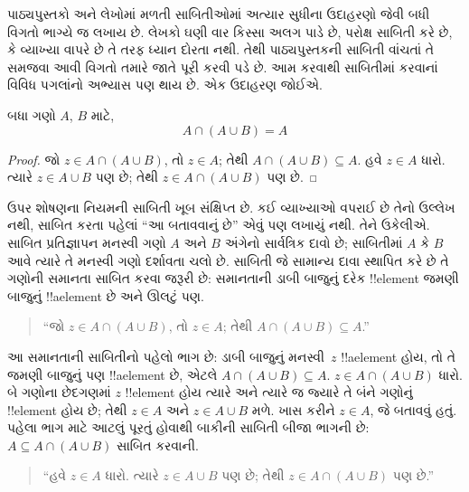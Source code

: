 \documentclass[../../../include/open-logic-section]{subfiles}
\begin{document}

પાઠ્યપુસ્તકો અને લેખોમાં મળતી સાબિતીઓમાં અત્યાર સુધીના
ઉદાહરણો જેવી બધી વિગતો ભાગ્યે જ લખાય છે. લેખકો ઘણી વાર
કિસ્સા અલગ પાડે છે, પરોક્ષ સાબિતી કરે છે, કે વ્યાખ્યા વાપરે છે
તે તરફ ધ્યાન દોરતા નથી. તેથી પાઠ્યપુસ્તકની સાબિતી વાંચતાં
તે સમજવા આવી વિગતો તમારે જાતે પૂરી કરવી પડે છે. આમ કરવાથી
સાબિતીમાં કરવાનાં વિવિધ પગલાંનો અભ્યાસ પણ થાય છે. એક
ઉદાહરણ જોઈએ.

\begin{prop}[શોષણ]
બધા ગણો $A$, $B$ માટે,
\[
A \cap (A \cup B) = A
\]
\end{prop}

\begin{proof}
જો $z \in A \cap (A \cup B)$, તો $z \in A$; તેથી $A \cap (A \cup B)
\subseteq A$. હવે $z \in A$ ધારો. ત્યારે $z \in A \cup B$ પણ છે;
તેથી $z \in A \cap (A \cup B)$ પણ છે.
\end{proof}

ઉપર શોષણના નિયમની સાબિતી ખૂબ સંક્ષિપ્ત છે. કઈ વ્યાખ્યાઓ
વપરાઈ છે તેનો ઉલ્લેખ નથી, સાબિત કરતા પહેલાં ``આ બતાવવાનું
છે'' એવું પણ લખાયું નથી. તેને ઉકેલીએ. સાબિત પ્રતિજ્ઞાપન
મનસ્વી ગણો $A$ અને $B$ અંગેનો સાર્વત્રિક દાવો છે; સાબિતીમાં
$A$ કે $B$ આવે ત્યારે તે મનસ્વી ગણો દર્શાવતા ચલો છે.
સાબિતી જે સામાન્ય દાવા સ્થાપિત કરે છે તે ગણોની સમાનતા
સાબિત કરવા જરૂરી છે: સમાનતાની ડાબી બાજુનું દરેક !!{element}
જમણી બાજુનું !!a{element} છે અને ઊલટું પણ.

\begin{quote}
``જો $z \in A \cap (A \cup B)$, તો $z \in A$; તેથી $A \cap (A \cup B)
  \subseteq A$.''
\end{quote}

આ સમાનતાની સાબિતીનો પહેલો ભાગ છે: ડાબી બાજુનું મનસ્વી~$z$
!!a{element} હોય, તો તે જમણી બાજુનું પણ !!a{element} છે,
એટલે $A \cap (A \cup B) \subseteq A$. $z \in A \cap (A \cup B)$
ધારો. બે ગણોના છેદગણમાં $z$ !!{element} હોય ત્યારે અને ત્યારે જ
જ્યારે તે બંને ગણોનું !!{element} હોય છે; તેથી $z \in A$
અને $z \in A \cup B$ મળે. ખાસ કરીને $z \in A$, જે બતાવવું
હતું. પહેલા ભાગ માટે આટલું પૂરતું હોવાથી બાકીની સાબિતી
બીજા ભાગની છે: $A \subseteq A \cap
(A \cup B)$ સાબિત કરવાની.

\begin{quote}
``હવે $z \in A$ ધારો. ત્યારે $z \in A \cup B$ પણ છે;
તેથી $z \in A \cap (A \cup B)$ પણ છે.''
\end{quote}
\end{document}
